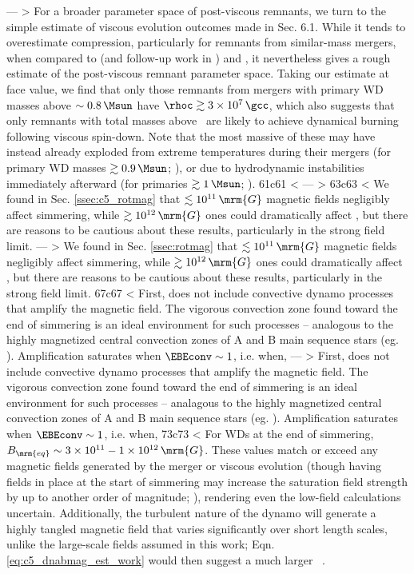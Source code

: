---
> For a broader parameter space of post-viscous remnants, we turn to the simple estimate of viscous evolution outcomes made in \citeal{zhu+13} Sec. 6.1.  While it tends to overestimate compression, particularly for remnants from similar-mass mergers, when compared to \citeauthor{schw+12} (and follow-up work in \citealt{rask+14}) and \cite{ji+13}, it nevertheless gives a rough estimate of the post-viscous remnant parameter space.  Taking our estimate at face value, we find that only those remnants from mergers with primary WD masses above $\sim0.8\,\Msun$ have $\rhoc \gtrsim 3\times10^7\,\gcc$, which also suggests that only remnants with total masses above \Mch\ are likely to achieve dynamical burning following viscous spin-down.  Note that the most massive of these may have instead already exploded from extreme temperatures during their mergers (for primary WD masses $\gtrsim0.9\,\Msun$; \citealt{pakm+10,pakm+11}), or due to hydrodynamic instabilities immediately afterward (for primaries $\gtrsim1\,\Msun$; \citealt{kash+15}).
61c61
< \label{ssec:c5_magaccuracy}
---
> \label{ssec:magaccuracy}
63c63
< We found in Sec. \ref{ssec:c5_rotmag} that $\lesssim10^{11}\,\mrm{G}$ magnetic fields negligibly affect simmering, while $\gtrsim10^{12}\,\mrm{G}$ ones could dramatically affect \vconv, but there are reasons to be cautious about these results, particularly in the strong field limit.
---
> We found in Sec. \ref{ssec:rotmag} that $\lesssim10^{11}\,\mrm{G}$ magnetic fields negligibly affect simmering, while $\gtrsim10^{12}\,\mrm{G}$ ones could dramatically affect \vconv, but there are reasons to be cautious about these results, particularly in the strong field limit.
67c67
< First, \citeal{stev79} does not include convective dynamo processes that amplify the magnetic field.  The vigorous convection zone found toward the end of simmering is an ideal environment for such processes -- analogous to the highly magnetized central convection zones of A and B main sequence stars (eg. \citealt{brunbt05, feat+09, augubt16}).  Amplification saturates when $\EBEconv \sim 1$, i.e. when, 
---
> First, \citeal{stev79} does not include convective dynamo processes that amplify the magnetic field.  The vigorous convection zone found toward the end of simmering is an ideal environment for such processes -- analagous to the highly magnetized central convection zones of A and B main sequence stars (eg. \citealt{brunbt05, feat+09, augubt16}).  Amplification saturates when $\EBEconv \sim 1$, i.e. when, 
73c73
< \noindent For WDs at the end of simmering, $B_\mrm{eq} \sim 3\times10^{11}-1\times10^{12}\,\mrm{G}$.  These values match or exceed any magnetic fields generated by the merger or viscous evolution (though having fields in place at the start of simmering may increase the saturation field strength by up to another order of magnitude; \citealt{feat+09}), rendering even the low-field calculations uncertain.  Additionally, the turbulent nature of the dynamo will generate a highly tangled magnetic field that varies significantly over short length scales, unlike the large-scale fields assumed in this work; Eqn. \ref{eq:c5_dnabmag_est_work} would then suggest a much larger \dnabmag\ \citep{chabgb07}.

